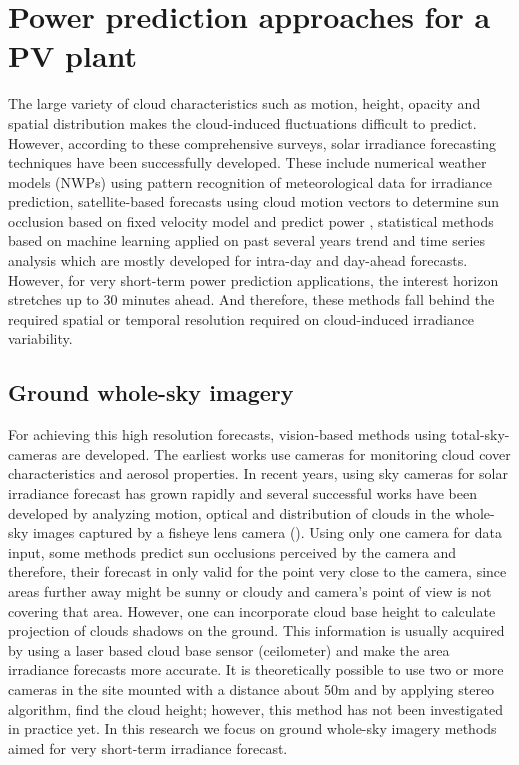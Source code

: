 \section{Power prediction approaches for a PV plant}
\label{sec:overview}
The large variety of cloud characteristics such as motion, height, opacity and spatial distribution makes the cloud-induced fluctuations difficult to predict. However, according to these comprehensive surveys\cite{survay1, survay2}, solar irradiance forecasting techniques have been successfully developed. 
These include numerical weather models (NWPs)\cite{nwp13} using pattern recognition of meteorological data for irradiance prediction, satellite-based forecasts using cloud motion vectors to determine sun occlusion based on fixed velocity model and predict power \cite{sat_based13,sat_based2004, sat_based99}, statistical methods based on machine learning applied on past several years trend\cite{stat_based13} and time series analysis\cite{time_serise09}
which are mostly developed for intra-day and day-ahead forecasts. However, for very short-term power prediction applications, the interest horizon stretches up to 30 minutes ahead. And therefore, these methods fall behind the required spatial or temporal resolution required on cloud-induced irradiance variability\cite{survay1}.

\subsection{Ground whole-sky imagery}
For achieving this high resolution forecasts, vision-based methods using total-sky-cameras are developed. The earliest works use cameras for monitoring cloud cover characteristics\cite{cloud_cover03, cloud_cover08} and aerosol properties\cite{areosal1, areosal2}. In recent years, using sky cameras for solar irradiance forecast has grown rapidly and several successful works have been developed by analyzing motion, optical and distribution of clouds in the whole-sky images captured by a fisheye lens camera (\cite{cloud_detection_using_RBR, cloud_height14, point_forecast14}). 
Using only one camera for data input, some methods\cite{point_forecast14} predict sun occlusions perceived by the camera and therefore, their forecast in only valid for the point very close to the camera, since areas further away might be sunny or cloudy and camera's point of view is not covering that area. However, one can incorporate cloud base height to calculate projection of clouds shadows on the ground. This information is usually acquired by using a laser based cloud base sensor (ceilometer) and make the area irradiance forecasts more accurate\cite{cloud_height14}. It is theoretically possible to use two or more cameras in the site mounted with a distance about 50m and by applying stereo algorithm, find the cloud height; however, this method has not been investigated in practice yet. In this research we focus on ground whole-sky imagery methods aimed for very short-term irradiance forecast.

